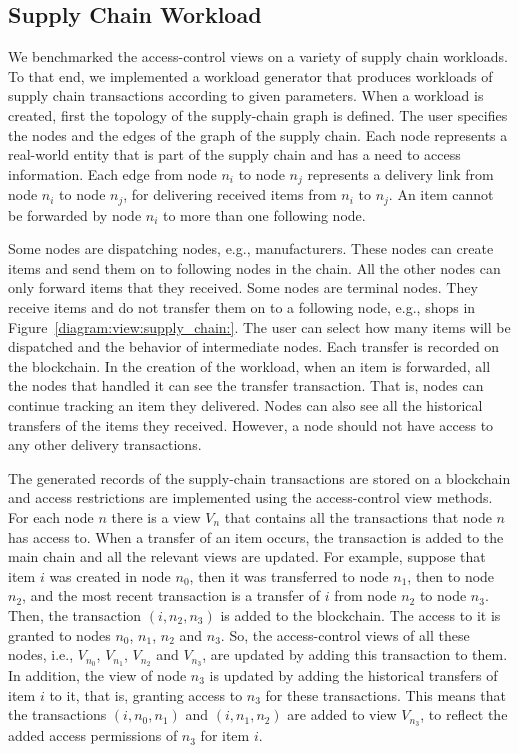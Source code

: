 \subsection{Supply Chain Workload}
We benchmarked the access-control views on a variety of supply chain workloads. 
To that end, we implemented a workload generator that produces workloads of supply chain transactions according to given parameters. When a workload is created, first the topology of the supply-chain graph is defined. The user specifies the nodes and the edges of the graph of the supply chain. Each node represents a real-world entity that is part of the supply chain and has a need to access information. Each edge from node $n_i$ to node $n_j$ represents a delivery link from node $n_i$ to node $n_j$, for delivering received items from $n_i$ to $n_j$. An item cannot be forwarded by node $n_i$ to more than one following node. 

Some nodes are dispatching nodes, e.g., manufacturers. These nodes can create items and send them on to following nodes in the chain. All the other nodes can only forward items that they received. Some nodes are terminal nodes. They receive items and do not transfer them on to a following node, e.g., shops in Figure~\ref{diagram:view:supply_chain:}. The user can select how many items will be dispatched and the behavior of intermediate nodes. Each transfer is recorded on the blockchain.
In the creation of the workload, when an item is forwarded, all the nodes that handled it can see the transfer transaction. That is, nodes can continue tracking an item they delivered. Nodes can also see all the historical transfers of the items they received. However, a node should not have access to any other delivery transactions. 

The generated records of the supply-chain transactions are stored on a blockchain and access restrictions are implemented using the access-control view methods. For each node $n$ there is a view $V_n$ that contains all the transactions that node $n$ has access to. When a transfer of an item occurs, the transaction is added to the main chain and all the relevant views are updated. For example, suppose that item $i$ was created in node $n_0$, then it was transferred to node $n_1$, then to node $n_2$, and the most recent transaction is a transfer of $i$ from node $n_2$ to node $n_3$. Then, the transaction $(i, n_2, n_3)$ is added to the blockchain. The access to it is granted to nodes $n_0$, $n_1$, $n_2$ and $n_3$. So, the access-control views of all these nodes, i.e., $V_{n_0}$, $V_{n_1}$, $V_{n_2}$ and $V_{n_3}$, are updated by adding this transaction to them. In addition, the view of node $n_3$ is updated by adding the historical transfers of item $i$ to it, that is, granting access to $n_3$ for these transactions. This means that the transactions $(i, n_0, n_1)$ and $(i, n_1, n_2)$ are added to view $V_{n_3}$, to reflect the added access permissions of $n_3$ for item $i$.  

